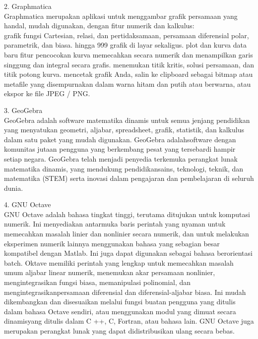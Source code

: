 \documentclass[a4paper,10pt]{article}
\begin{document}
\begin{eulernotebook}
\begin{eulercomment}
2. Graphmatica\\
Graphmatica merupakan aplikasi untuk menggambar grafik persamaan yang
handal, mudah digunakan, dengan fitur numerik dan kalkulus:\\
grafik fungsi Cartesian, relasi, dan pertidaksamaan, persamaan
diferensial polar, parametrik, dan biasa. hingga 999 grafik di layar
sekaligus. plot dan kurva data baru fitur pencocokan kurva memecahkan
secara numerik dan menampilkan garis singgung dan integral secara
grafis. menemukan titik kritis, solusi persamaan, dan titik potong
kurva. mencetak grafik Anda, salin ke clipboard sebagai bitmap atau
metafile yang disempurnakan dalam warna hitam dan putih atau berwarna,
atau ekspor ke file JPEG / PNG.

3. GeoGebra\\
GeoGebra adalah software matematika dinamis untuk semua jenjang
pendidikan yang menyatukan geometri, aljabar, spreadsheet, grafik,
statistik, dan kalkulus dalam satu paket yang mudah digunakan.
GeoGebra adalahsoftware dengan komunitas jutaan pengguna yang
berkembang pesat yang tersebardi hampir setiap negara. GeoGebra telah
menjadi penyedia terkemuka perangkat lunak matematika dinamis, yang
mendukung pendidikansains, teknologi, teknik, dan matematika (STEM)
serta inovasi dalam pengajaran dan pembelajaran di seluruh dunia.

4. GNU Octave\\
GNU Octave adalah bahasa tingkat tinggi, terutama ditujukan untuk
komputasi numerik. Ini menyediakan antarmuka baris perintah yang
nyaman untuk memecahkan masalah linier dan nonlinier secara numerik,
dan untuk melakukan eksperimen numerik lainnya menggunakan bahasa yang
sebagian besar kompatibel dengan Matlab. Ini juga dapat digunakan
sebagai bahasa berorientasi batch. Oktave memiliki perintah yang
lengkap untuk memecahkan masalah umum aljabar linear numerik,
menemukan akar persamaan nonlinier, mengintegrasikan fungsi biasa,
memanipulasi polinomial, dan mengintegrasikanpersamaan diferensial dan
diferensial-aljabar biasa. Ini mudah dikembangkan dan disesuaikan
melalui fungsi buatan pengguna yang ditulis dalam bahasa Octave
sendiri, atau menggunakan modul yang dimuat secara dinamisyang ditulis
dalam C ++, C, Fortran, atau bahasa lain. GNU Octave juga merupakan
perangkat lunak yang dapat didistribusikan ulang secara bebas.


\end{eulercomment}
\end{eulernotebook}
\end{document}
